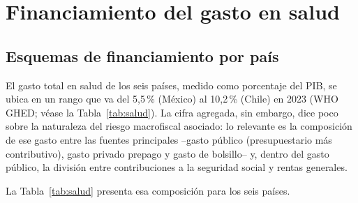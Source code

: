 \documentclass[12pt, letterpaper]{article}
\begin{document}
\newpage

\section{Financiamiento del gasto en salud}

\subsection{Esquemas de financiamiento por país}
\label{sec:esquemas-salud}

El gasto total en salud de los seis países, medido como porcentaje del PIB, se ubica
en un rango que va del 5{,}5\,\% (México) al 10{,}2\,\% (Chile) en 2023 (WHO
GHED; véase la Tabla~\ref{tab:salud}). La cifra agregada, sin embargo, dice poco
sobre la naturaleza del riesgo macrofiscal asociado: lo relevante es la composición
de ese gasto entre las fuentes principales --gasto público (presupuestario más
contributivo), gasto privado prepago y gasto de bolsillo-- y, dentro del gasto
público, la división entre contribuciones a la seguridad social y rentas generales.

La Tabla~\ref{tab:salud} presenta esa composición para los seis países.
\end{document}
